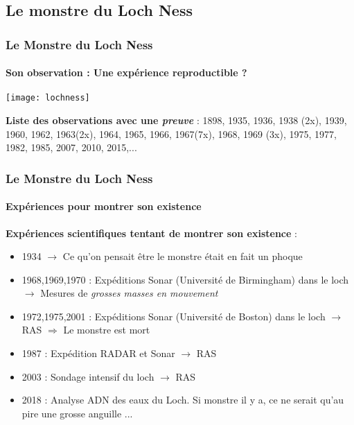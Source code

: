 \documentclass[11pt]{beamer}
\begin{document}
\subsection{Le monstre du Loch Ness}
\begin{frame}
\frametitle{Le Monstre du Loch Ness}
\framesubtitle{Son observation : Une expérience reproductible ?}
\begin{center}
	\texttt{[image: lochness]}
\end{center}
\textbf{Liste des observations avec une \textit{preuve}} : 1898, 1935, 1936, 1938 (2x), 1939, 1960, 1962, 1963(2x), 1964, 1965, 1966, 1967(7x), 1968, 1969 (3x), 1975, 1977, 1982, 1985, 2007, 2010, 2015,...
\end{frame}
\begin{frame}
\frametitle{Le Monstre du Loch Ness}
\framesubtitle{Expériences pour montrer son existence}
\textbf{Expériences scientifiques tentant de montrer son existence} : 
\begin{itemize}
	\item 1934 $\rightarrow$ Ce qu'on pensait être le monstre était en fait un phoque
	\item 1968,1969,1970 : Expéditions Sonar (Université de Birmingham) dans le loch $\rightarrow$ Mesures de \textit{grosses masses en mouvement}
	\item 1972,1975,2001 : Expéditions Sonar (Université de Boston) dans le loch $\rightarrow$ RAS $\Rightarrow$ Le monstre est mort
	\item 1987 : Expédition RADAR et Sonar $\rightarrow$ RAS
	\item 2003 : Sondage intensif du loch  $\rightarrow$ RAS
	\item 2018 : Analyse ADN des eaux du Loch. Si monstre il y a, ce ne serait qu'au pire une grosse anguille ...
\end{itemize}
\end{frame}
\end{document}
